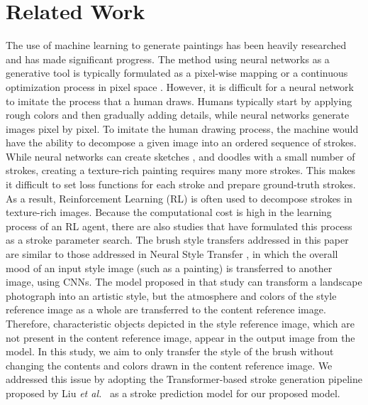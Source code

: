 \documentclass{mva_style}
\begin{document}
\section{Related Work}
The use of machine learning to generate paintings has been heavily researched 
and has made significant progress. The method using neural networks as a 
generative tool is typically formulated as a pixel-wise mapping \cite{PerceptualLosses} 
or a continuous optimization process in pixel space \cite{ImageStyleTransfer}.
However, it is difficult for a neural network to imitate the process that a 
human draws. Humans typically start 
by applying rough colors and then gradually adding details, while neural 
networks generate images pixel by pixel. To imitate the human drawing 
process, the machine would have the ability to decompose a given image into 
an ordered sequence of strokes. While neural networks can create sketches 
\cite{DBLP:journals/corr/HaE17}, \cite{DBLP:journals/corr/abs-1805-00247} 
and doodles \cite{DBLP:journals/corr/abs-1810-05977} with a small number of 
strokes, creating a texture-rich painting requires many more strokes.
This makes it difficult to set loss functions for each stroke and prepare 
ground-truth strokes. As a result, Reinforcement Learning (RL) is often used 
to decompose strokes in texture-rich images. \cite{DBLP:journals/corr/abs-1804-01118, DBLP:journals/corr/abs-1206-4634, Huang_2019_ICCV}
Because the computational cost is high in the learning process of an RL agent, 
there are also studies that have formulated this process as a stroke 
parameter search. \cite{PaintTransformer}
The brush style transfers addressed in this paper are similar to those 
addressed in Neural Style Transfer \cite{ImageStyleTransfer}, in which the 
overall mood of an input style image (such as a painting) is transferred to 
another image, using CNNs. The model proposed in that study can transform a 
landscape photograph into an artistic style, but the atmosphere and colors of 
the style reference image as a whole are transferred to the content reference 
image. Therefore, characteristic objects depicted in the style reference 
image, which are not present in the content reference image, appear in the 
output image from the model. 
In this study, we aim to only transfer the style of the brush without changing 
the contents and colors drawn in the content reference image. We addressed 
this issue by adopting the Transformer-based stroke generation pipeline 
proposed by Liu \textit{et al.}~\cite{PaintTransformer} as a stroke prediction 
model for our proposed model.
\end{document}
